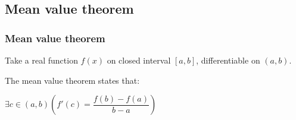 
\subsection{Mean value theorem}

\subsubsection{Mean value theorem}

Take a real function \(f(x)\) on closed interval \([a,b]\), differentiable on \((a,b)\).

The mean value theorem states that:

\(\exists c\in(a,b) (f'(c)=\dfrac{f(b)-f(a)}{b-a})\)

